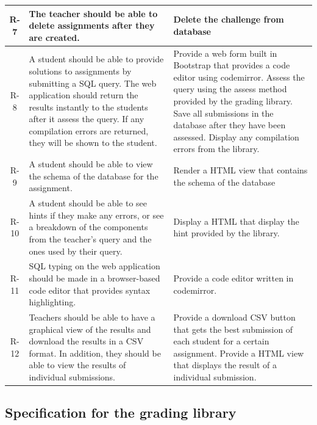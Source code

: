 \begin{tabularx}{\textwidth}{|c|Y|Y|}
  R-7 & The teacher should be able to delete assignments after they are created. & Delete the challenge from database \\\hline
  R-8 & A student should be able to provide solutions to assignments by submitting a SQL query. The web application should return the results instantly to the students after it assess the query. If any compilation errors are returned, they will be shown to the student. & Provide a web form built in Bootstrap that provides a code editor using codemirror. Assess the query using the assess method provided by the grading library. Save all submissions in the database after they have been assessed. Display any compilation errors from the library. \\\hline
  R-9 & A student should be able to view the schema of the database for the assignment. & Render a HTML view that contains the schema of the database \\\hline
  R-10 & A  student  should  be  able  to  see  hints  if  they make any  errors, or see a breakdown of the components from the teacher’s query and the ones used by their query. & Display a HTML that display the hint provided by the library. \\\hline
  R-11 & SQL typing on the web application should be made in a browser-based code editor that provides syntax highlighting. & Provide a code editor written in codemirror. \\\hline
  R-12 & Teachers should be able to have a graphical view of the results and download the results in  a CSV format.   In  addition,  they  should  be  able  to  view  the  results  of individual submissions. & Provide a download CSV button that gets the best submission of each student for a certain assignment. Provide a HTML view that displays the result of a individual submission. \\\hline
\end{tabularx}

\subsection{Specification for the grading library}

